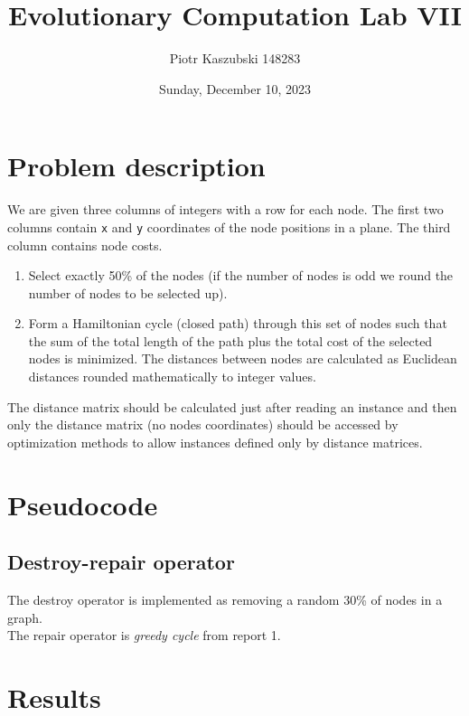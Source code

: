 \documentclass[14pt]{article}
\title{Evolutionary Computation Lab VII}
\author{Piotr Kaszubski 148283}
\date{Sunday, December 10, 2023}
\begin{document}
\maketitle
\tableofcontents
\newpage

\section{Problem description}
We are given three columns of integers with a row for each node. The first two
columns contain \verb`x` and \verb`y` coordinates of the node positions in a
plane. The third column contains node costs.

\begin{enumerate}
	\item Select exactly 50\% of the nodes (if the number of nodes is odd we
		round the number of nodes to be selected up).
	\item Form a Hamiltonian cycle (closed path) through this set of nodes such
		that the sum of the total length of the path plus the total cost of the
		selected nodes is minimized. The distances between nodes are calculated
		as Euclidean distances rounded mathematically to integer values.
\end{enumerate}

The distance matrix should be calculated just after reading an instance and
then only the distance matrix (no nodes coordinates) should be accessed by
optimization methods to allow instances defined only by distance matrices.

\section{Pseudocode}

\subsection{Destroy-repair operator}
The destroy operator is implemented as removing a random 30\% of nodes in a graph. \\
The repair operator is \emph{greedy cycle} from report 1.

\section{Results}
\end{document}
